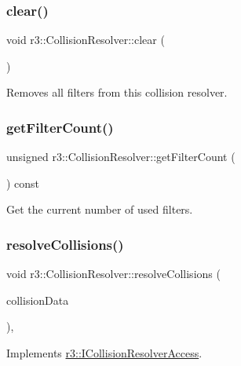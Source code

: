 \subsubsection{\texorpdfstring{clear()}{clear()}}
{\footnotesize\ttfamily void r3\+::\+Collision\+Resolver\+::clear (\begin{DoxyParamCaption}{ }\end{DoxyParamCaption})}

Removes all filters from this collision resolver. \mbox{\label{classr3_1_1_collision_resolver_ae56e2125e24982ad368f0d87e9c2a28f}} 
\subsubsection{\texorpdfstring{get\+Filter\+Count()}{getFilterCount()}}
{\footnotesize\ttfamily unsigned r3\+::\+Collision\+Resolver\+::get\+Filter\+Count (\begin{DoxyParamCaption}{ }\end{DoxyParamCaption}) const}

Get the current number of used filters. \mbox{\label{classr3_1_1_collision_resolver_a5eeac10ca33299662b0df8a77f6c25f5}} 
\subsubsection{\texorpdfstring{resolve\+Collisions()}{resolveCollisions()}}
{\footnotesize\ttfamily void r3\+::\+Collision\+Resolver\+::resolve\+Collisions (\begin{DoxyParamCaption}\item[{const \mbox{\hyperlink{classr3_1_1_collision_data}{Collision\+Data}} \&}]{collision\+Data }\end{DoxyParamCaption})\hspace{0.3cm}{\ttfamily [override]}, {\ttfamily [virtual]}}



Implements \mbox{\hyperlink{classr3_1_1_i_collision_resolver_access_a9f7d7bdd46fa4448b3acc5e79a3c724b}{r3\+::\+I\+Collision\+Resolver\+Access}}.



